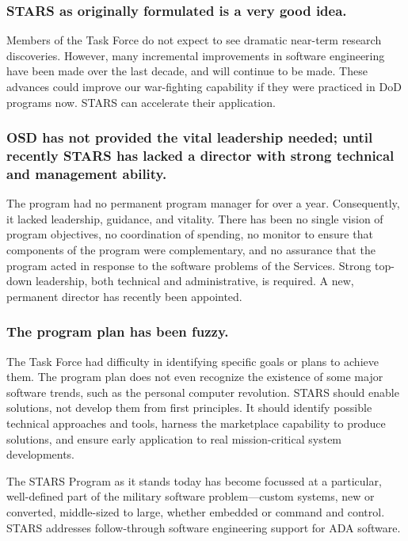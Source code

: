 \documentclass[12pt,final]{article}
\begin{document}
\subsubsection*{STARS as originally formulated is a very good idea.}

Members of the Task Force do not expect to see dramatic near-term research
discoveries. However, many incremental improvements in software engineering
have been made over the last decade, and will continue to be made. These
advances could improve our war-fighting capability if they were practiced in
DoD programs now. STARS can accelerate their application.

\subsubsection*{OSD has not provided the vital leadership needed; until recently
STARS has lacked a director with strong technical and management ability.}

The program had no permanent program manager for over a year. Consequently, it
lacked leadership, guidance, and vitality. There has been no single vision of
program objectives, no coordination of spending, no monitor to ensure that
components of the program were complementary, and no assurance that the program
acted in response to the software problems of the Services. Strong top-down
leadership, both technical and administrative, is required. A new, permanent
director has recently been appointed.

\subsubsection*{The program plan has been fuzzy.}

The Task Force had difficulty in identifying specific goals or plans to achieve
them. The program plan does not even recognize the existence of some major
software trends, such as the personal computer revolution. STARS should enable
solutions, not develop them from first principles. It should identify possible
technical approaches and tools, harness the marketplace capability to produce
solutions, and ensure early application to real mission-critical system
developments.

The STARS Program as it stands today has become focussed at a particular,
well-defined part of the military software problem—custom systems, new or
converted, middle-sized to large, whether embedded or command and control.
STARS addresses follow-through software engineering support for ADA software.
\end{document}
